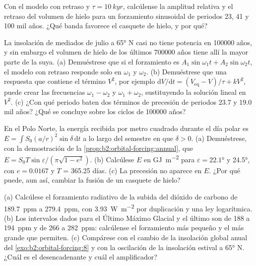 \begin{exercise}[$\star\star$]\label{exo:b2:orbital-forcing:9}
Con el modelo con retraso y $\tau = \qty{10}{kyr}$, calcúlense la amplitud relativa y el retraso del
volumen de hielo para un forzamiento sinusoidal de periodos 23, 41 y \num{100} mil años. ¿Qué banda
favorece el casquete de hielo, y por qué?
\end{exercise}

\begin{exercise}[$\star\star\star$]\label{exo:b2:orbital-forcing:10}
La insolación de mediados de julio a \ang{65} N casi no tiene potencia en \num{100000} años, y sin embargo el volumen de hielo
de los últimos \num{700000} años tiene allí la mayor parte de la suya. (a) Demuéstrese que si el forzamiento es $A_1\sin
\omega_1 t + A_2\sin\omega_2 t$, el modelo con retraso responde solo en $\omega_1$ y $\omega_2$. (b) Demuéstrese
que una respuesta que contiene el término $V^2$, por ejemplo $\mathrm dV/\mathrm dt = (V_{\mathrm{eq}} -
V)/\tau + kV^2$, puede crear las frecuencias $\omega_1 - \omega_2$ y $\omega_1 + \omega_2$,
sustituyendo la solución lineal en $V^2$. (c) ¿Con qué periodo baten dos términos de precesión de periodos \num{23.7} y
\num{19.0} mil años? ¿Qué se concluye sobre los ciclos de
\num{100000} años?
\end{exercise}

\begin{exercise}[$\star\star\star$]\label{exo:b2:orbital-forcing:11}
En el Polo Norte, la energía recibida por metro cuadrado durante el día polar es $E = \int S_0(a/r)^2
\sin\delta\,\mathrm dt$ a lo largo del semestre en que $\delta > 0$. (a) Demuéstrese, con la demostración de la
\cref{prop:b2:orbital-forcing:annual}, que $E = S_0T\sin\varepsilon/(\pi\sqrt{1 - e^2})$. (b) Calcúlese
$E$ en \unit{GJ.m^{-2}} para $\varepsilon = \ang{22.1}$ y \ang{24.5}, con $e = 0.0167$ y $T$ =
365.25 días. (c) La precesión no aparece en $E$. ¿Por qué puede, aun así, cambiar la
fusión de un casquete de hielo?
\end{exercise}

\begin{exercise}[$\star\star\star$]\label{exo:b2:orbital-forcing:12}
(a) Calcúlese el forzamiento radiativo de la subida del dióxido de carbono de \qty{189.7}{ppm} a
\qty{279.4}{ppm}, con \qty{3.93}{W.m^{-2}} por duplicación y una ley logarítmica. (b) Los intervalos
dados para el Último Máximo Glacial y el último  son de 188 a \qty{194}{ppm} y de 266 a
\qty{282}{ppm}: calcúlense el forzamiento más pequeño y el más grande que permiten. (c) Compárese con el cambio
de la insolación global anual del \cref{exo:b2:orbital-forcing:8} y con la oscilación de la
insolación estival a \ang{65} N. ¿Cuál es el desencadenante y cuál el amplificador?
\end{exercise}

